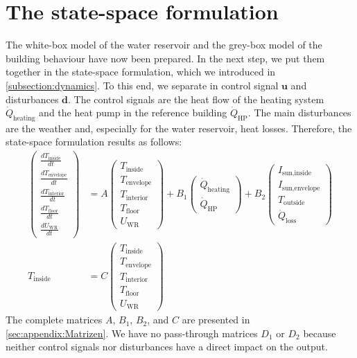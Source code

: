     \section{The state-space formulation}
    \label{holeModel}
    The white-box model of the water reservoir and the grey-box model of the building behaviour have now been prepared. In the next step, we put them together in the state-space formulation, which we introduced in \autoref{subsection:dynamics}.\newline
    To this end, we separate in control signal $\textbf{u}$ and disturbances $\textbf{d}$. The control signals are the heat flow of the heating system $\dot{Q}_\text{heating}$ and the heat pump in the reference building $\dot{Q}_\text{HP}$. The main disturbances are the weather and, especially for the water reservoir, heat losses. Therefore, the state-space formulation results as follows: 
  \begin{align}
	    \label{eq:ZRD Modell}
	 \left(\begin{array}{c} \frac{d T_\text{inside}}{d t} \\ \frac{d T_\text{envelope}}{d t} \\ \frac{d T_\text{interior}}{d t}\\ \frac{d T_\text{floor}}{d t}\\ \frac{d U_\text{WR}}{d t} \end{array}\right) &= A \left(\begin{array}{c} T_\text{inside} \\ T_\text{envelope} \\ T_\text{interior}\\ T_\text{floor}\\ U_\text{WR} \end{array}\right) + B_\text{1} \left(\begin{array}{c} \dot{Q}_\text{heating} \\ \dot{Q}_\text{HP} \end{array}\right) + B_\text{2} \left(\begin{array}{c} I_\text{sun,inside}\\ I_\text{sun,envelope}\\ T_\text{outside} \\ \dot{Q}_\text{loss} \end{array}\right) \\
	 T_\text{inside} &= C \left(\begin{array}{c} T_\text{inside} \\ T_\text{envelope} \\ T_\text{interior}\\ T_\text{floor}\\ U_\text{WR} \end{array}\right) \label{y}
	\end{align}	
    The complete matrices $A$, $B_\text{1}$, $B_\text{2}$, and $C$ are presented in \autoref{sec:appendix:Matrizen}. We have no pass-through matrices $D_\text{1}$ or $D_\text{2}$ because neither control signals nor disturbances have a direct impact on the output.
